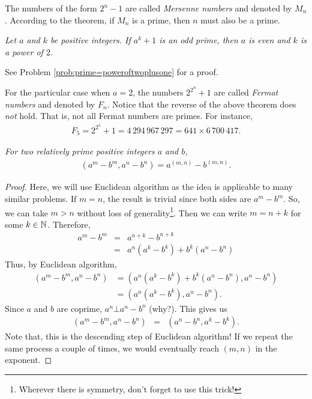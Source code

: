 \documentclass{subfile}
\begin{document}
	\begin{remark}
		The numbers of the form $2^n-1$ are called \textit{Mersenne numbers} and denoted by $M_n$. According to the theorem, if $M_n$ is a prime, then $n$ must also be a prime.
	\end{remark}

	\begin{theorem}\slshape\label{thm:primec}
		Let $a$ and $k$ be positive integers. If $a^k+1$ is an odd prime, then $a$ is even and $k$ is a power of $2$.
	\end{theorem}

	See Problem \ref{prob:prime=poweroftwoplusone} for a proof.

	\begin{remark}
		For the particular case when $a=2$, the numbers $2^{2^n}+1$ are called \textit{Fermat numbers} and denoted by $F_n$. Notice that the reverse of the above theorem does \textit{not} hold. That is, not all Fermat numbers are primes. For instance,
		\begin{align*}
			F_5 = 2^{2^5}+1 = 4\, 294\, 967\, 297 = 641 \times 6\, 700\, 417.
		\end{align*}
	\end{remark}

	\begin{theorem}\slshape
		For two relatively prime positive integers $a$ and $b$,
		\begin{align*}
			(a^m-b^m,a^n-b^n)=a^{(m,n)}-b^{(m,n)}.
		\end{align*}
	\end{theorem}

	\begin{proof}
		Here, we will use Euclidean algorithm as the idea is applicable to many similar problems. If $m=n$, the result is trivial since both sides are $a^m-b^m$. So, we can take $m>n$ without loss of generality\footnote{Wherever there is symmetry, don't forget to use this trick!}. Then we can write $m=n+k$ for some $k\in\mathbb{N}$. Therefore,
		\begin{eqnarray*}
			a^m-b^m & = & a^{n+k}-b^{n+k}\\
			& = & a^n(a^k-b^k)+b^k(a^n-b^n)
		\end{eqnarray*}
		Thus, by Euclidean algorithm,
		\begin{align*}
			(a^m-b^m,a^n-b^n) & = (a^n(a^k-b^k)+b^k(a^n-b^n),a^n-b^n)\\
			&=(a^n(a^k-b^k),a^n-b^n).
		\end{align*}
		Since $a$ and $b$ are coprime, $a^n\bot a^n-b^n$ (why?). This gives us
		\begin{eqnarray*}
			(a^m-b^m,a^n-b^n) & = & (a^n-b^n,a^k-b^k).
		\end{eqnarray*}
		Note that, this is the descending step of Euclidean algorithm! If we repeat the same process a couple of times, we would eventually reach $(m,n)$ in the exponent.
	\end{proof}
\end{document}
